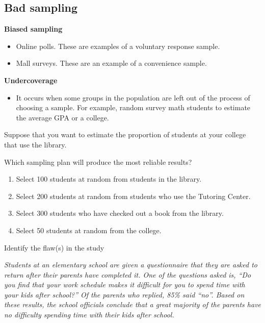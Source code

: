 \hypertarget{bad-sampling}{%
\subsection{Bad sampling}\label{bad-sampling}}

\textbf{Biased sampling}
  \begin{itemize}
  \item
    Online polls. These are examples of a voluntary response sample.
  \item
    Mall surveys. These are an example of a convenience sample.
  \end{itemize}

\textbf{Undercoverage}
  \begin{itemize}
  \item
    It occurs when some groups in the population are left out of the
    process of choosing a sample. For example, random survey math
    students to estimate the average GPA or a college.
  \end{itemize}

\begin{example}
  Suppose that you want to estimate the proportion of students at your
  college that use the library.
  
  Which sampling plan will produce the most reliable results?
  
  \begin{enumerate}[parsep=0pt]
  \item
    Select 100 students at random from students in the library.
  \item
    Select 200 students at random from students who use the Tutoring
    Center.
  \item
    Select 300 students who have checked out a book from the library.
  \item
    Select 50 students at random from the college.
  \end{enumerate}
\end{example}

\begin{exercise}
  Identify the flaw(s) in the study
  
  \textit{Students at an elementary school are given a questionnaire that they are
  asked to return after their parents have completed it. One of the
  questions asked is, ``Do you find that your work schedule makes it
  difficult for you to spend time with your kids after school?'' Of the
  parents who replied, 85\% said ``no''. Based on these results, the
  school officials conclude that a great majority of the parents have no
  difficulty spending time with their kids after school.}
\end{exercise}
\vspace*{2\baselineskip}

